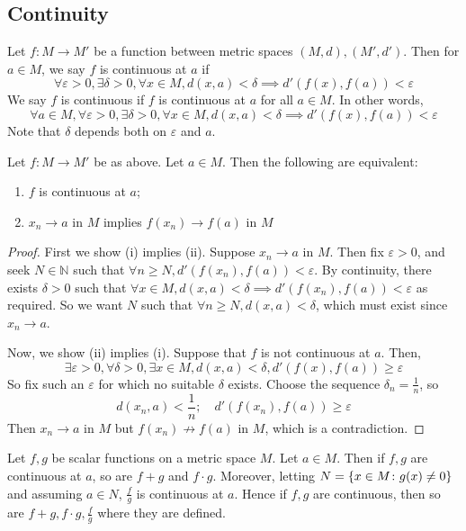 \subsection{Continuity}
\begin{definition}
	Let \( f \colon M \to M' \) be a function between metric spaces \( (M, d), (M', d') \).
	Then for \( a \in M \), we say \( f \) is continuous at \( a \) if
	\[
		\forall \varepsilon > 0, \exists \delta > 0, \forall x \in M, d(x,a) < \delta \implies d'(f(x), f(a)) < \varepsilon
	\]
	We say \( f \) is continuous if \( f \) is continuous at \( a \) for all \( a \in M \).
	In other words,
	\[
		\forall a \in M, \forall \varepsilon > 0, \exists \delta > 0, \forall x \in M, d(x,a) < \delta \implies d'(f(x), f(a)) < \varepsilon
	\]
	Note that \( \delta \) depends both on \( \varepsilon \) and \( a \).
\end{definition}
\begin{proposition}
	Let \( f \colon M \to M' \) be as above.
	Let \( a \in M \).
	Then the following are equivalent:
	\begin{enumerate}
		\item \( f \) is continuous at \( a \);
		\item \( x_n \to a \) in \( M \) implies \( f(x_n) \to f(a) \) in \( M \)
	\end{enumerate}
\end{proposition}
\begin{proof}
	First we show (i) implies (ii).
	Suppose \( x_n \to a \) in \( M \).
	Then fix \( \varepsilon > 0 \), and seek \( N \in \mathbb N \) such that \( \forall n \geq N, d'(f(x_n), f(a)) < \varepsilon \).
	By continuity, there exists \( \delta > 0 \) such that \( \forall x \in M, d(x,a) < \delta \implies d'(f(x_n), f(a)) < \varepsilon \) as required.
	So we want \( N \) such that \( \forall n \geq N, d(x,a) < \delta \), which must exist since \( x_n \to a \).

	Now, we show (ii) implies (i).
	Suppose that \( f \) is not continuous at \( a \).
	Then,
	\[
		\exists \varepsilon > 0, \forall \delta > 0, \exists x \in M, d(x,a) < \delta, d'(f(x), f(a)) \geq \varepsilon
	\]
	So fix such an \( \varepsilon \) for which no suitable \( \delta \) exists.
	Choose the sequence \( \delta_n = \frac{1}{n} \), so
	\[
		d(x_n,a) < \frac{1}{n};\quad d'(f(x_n), f(a)) \geq \varepsilon
	\]
	Then \( x_n \to a \) in \( M \) but \( f(x_n) \nrightarrow f(a) \) in \( M \), which is a contradiction.
\end{proof}
\begin{proposition}
	Let \( f,g \) be scalar functions on a metric space \( M \).
	Let \( a \in M \).
	Then if \( f,g \) are continuous at \( a \), so are \( f+g \) and \( f \cdot g \).
	Moreover, letting \( N = \qty{x \in M \colon g(x) \neq 0} \) and assuming \( a \in N \), \( \frac{f}{g} \) is continuous at \( a \).
	Hence if \( f,g \) are continuous, then so are \( f+g, f \cdot g, \frac{f}{g} \) where they are defined.
\end{proposition}
